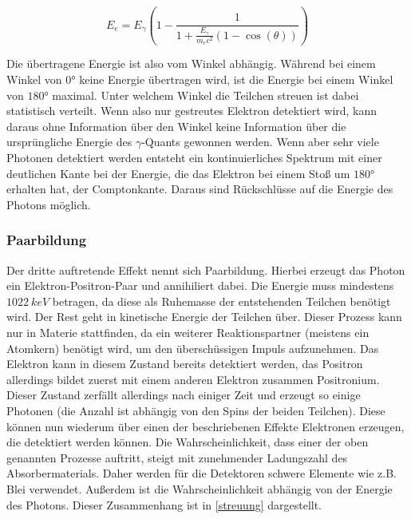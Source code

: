 \begin{equation}
	E_e = E_\gamma \left( 1-\frac{1}{1 + \frac{E_\gamma}{m_ec^2}\left( 1-\cos\left(\theta\right)\right)}\right)
	\label{eq:compton}
\end{equation}

Die übertragene Energie ist also vom Winkel abhängig. Während bei einem Winkel von $0$° keine Energie übertragen wird, ist die Energie bei einem Winkel von $180$° maximal. Unter welchem Winkel die Teilchen streuen ist dabei statistisch verteilt. Wenn also nur gestreutes Elektron detektiert wird, kann daraus ohne Information über den Winkel keine Information über die ursprüngliche Energie des $\gamma$-Quants gewonnen werden. Wenn aber sehr viele Photonen detektiert werden entsteht ein kontinuierliches Spektrum mit einer deutlichen Kante bei der Energie, die das Elektron bei einem Stoß um $180$° erhalten hat, der Comptonkante. Daraus sind Rückschlüsse auf die Energie des Photons möglich.

\subsubsection{Paarbildung}
Der dritte auftretende Effekt nennt sich Paarbildung. Hierbei erzeugt das Photon ein Elektron-Positron-Paar und annihiliert dabei. Die Energie muss mindestens $\SI{1022}{keV}$ betragen, da diese als Ruhemasse der entstehenden Teilchen benötigt wird. Der Rest geht in kinetische Energie der Teilchen über. Dieser Prozess kann nur in Materie stattfinden, da ein weiterer Reaktionspartner (meistens ein Atomkern) benötigt wird, um den überschüssigen Impuls aufzunehmen. Das Elektron kann in diesem Zustand bereits detektiert werden, das Positron allerdings bildet zuerst mit einem anderen Elektron zusammen Positronium. Dieser Zustand zerfällt allerdings nach einiger Zeit und erzeugt so einige Photonen (die Anzahl ist abhängig von den Spins der beiden Teilchen). Diese können nun wiederum über einen der beschriebenen Effekte Elektronen erzeugen, die detektiert werden können. Die Wahrscheinlichkeit, dass einer der oben genannten Prozesse auftritt, steigt mit zunehmender Ladungszahl des Absorbermaterials. Daher werden für die Detektoren schwere Elemente wie z.B. Blei verwendet. Außerdem ist die Wahrscheinlichkeit abhängig von der Energie des Photons. Dieser Zusammenhang ist in \cref{streuung} dargestellt.

